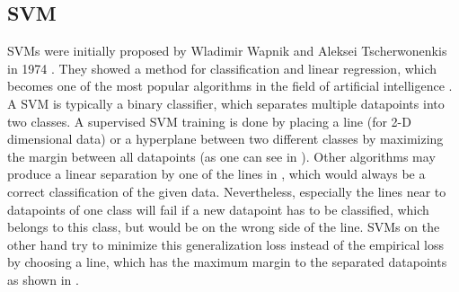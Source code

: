 \subsection{\acf*{SVM}}
\label{sec:svm}

\acfp{SVM} were initially proposed by Wladimir Wapnik and Aleksei Tscherwonenkis in 1974 \cite{vapnik1974theory}. They showed a method for classification and linear regression, which becomes one of the most popular algorithms in the field of artificial intelligence \cite{russellnorvig-ai}. A \ac{SVM} is typically a binary classifier, which separates multiple datapoints into two classes. A supervised \ac{SVM} training is done by placing a line (for 2-D dimensional data) or a hyperplane between two different classes by maximizing the margin between all datapoints (as one can see in ). Other algorithms may produce a linear separation by one of the lines in , which would always be a correct classification of the given data. Nevertheless, especially the lines near to datapoints of one class will fail if a new datapoint has to be classified, which belongs to this class, but would be on the wrong side of the line. \acp{SVM} on the other hand try to minimize this generalization loss instead of the empirical loss by choosing a line, which has the maximum margin to the separated datapoints as shown in .


